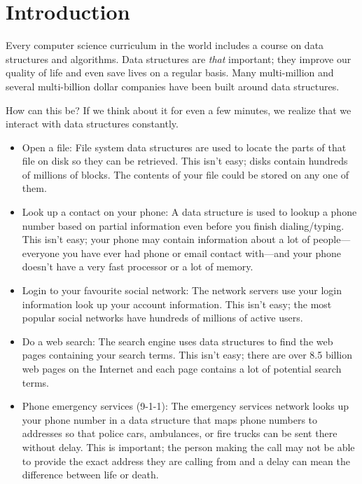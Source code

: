 \chapter{Introduction}

Every computer science curriculum in the world includes a course on data
structures and algorithms.  Data structures are \emph{that} important;
they improve our quality of life and even save lives on a regular basis.
Many multi-million and several multi-billion dollar companies have been
built around data structures.

How can this be?  If we think about it for even a few minutes, we
realize that we interact with data structures constantly.
\begin{itemize}
  \item  Open a file: File system data structures are used to locate
    the parts of that file on disk so they can be retrieved.  This isn't
    easy; disks contain hundreds of millions of blocks.  The contents of your
    file could be stored on any one of them.
  \item Look up a contact on your phone:  A data
    structure is used to lookup a phone number based on partial
    information even before you finish dialing/typing.  This isn't
    easy; your phone may contain information about a lot of
    people---everyone you have ever had phone or email contact with---and
    your phone doesn't have a very fast processor or a lot of memory.
  \item Login to your favourite social network:  The network servers
    use your login information look up your account information.
    This isn't easy; the most popular social networks have hundreds of
    millions of active users.
  \item Do a web search: The search engine uses data structures to find
    the web pages containing your search terms.  This isn't easy; there
    are over 8.5 billion web pages on the Internet and each page contains
    a lot of potential search terms.
  \item Phone emergency services (9-1-1):  The emergency services network
    looks up your phone number in a data structure that maps phone numbers
    to addresses so that police cars, ambulances, or fire trucks can be
    sent there without delay. This is important;  the person making the
    call may not be able to provide the exact address they are calling
    from and a delay can mean the difference between life or death.
\end{itemize}

